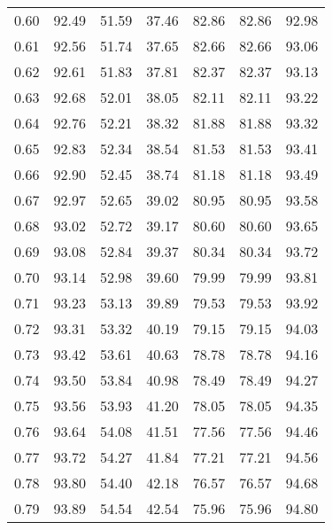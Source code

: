 \begin{tabular}{|c|c|c|c|c|c|c|}
      0.60 &     92.49 &     51.59 &      37.46 &   82.86 &      82.86 &         92.98 \\
      0.61 &     92.56 &     51.74 &      37.65 &   82.66 &      82.66 &         93.06 \\
      0.62 &     92.61 &     51.83 &      37.81 &   82.37 &      82.37 &         93.13 \\
      0.63 &     92.68 &     52.01 &      38.05 &   82.11 &      82.11 &         93.22 \\
      0.64 &     92.76 &     52.21 &      38.32 &   81.88 &      81.88 &         93.32 \\
      0.65 &     92.83 &     52.34 &      38.54 &   81.53 &      81.53 &         93.41 \\
      0.66 &     92.90 &     52.45 &      38.74 &   81.18 &      81.18 &         93.49 \\
      0.67 &     92.97 &     52.65 &      39.02 &   80.95 &      80.95 &         93.58 \\
      0.68 &     93.02 &     52.72 &      39.17 &   80.60 &      80.60 &         93.65 \\
      0.69 &     93.08 &     52.84 &      39.37 &   80.34 &      80.34 &         93.72 \\
      0.70 &     93.14 &     52.98 &      39.60 &   79.99 &      79.99 &         93.81 \\
      0.71 &     93.23 &     53.13 &      39.89 &   79.53 &      79.53 &         93.92 \\
      0.72 &     93.31 &     53.32 &      40.19 &   79.15 &      79.15 &         94.03 \\
      0.73 &     93.42 &     53.61 &      40.63 &   78.78 &      78.78 &         94.16 \\
      0.74 &     93.50 &     53.84 &      40.98 &   78.49 &      78.49 &         94.27 \\
      0.75 &     93.56 &     53.93 &      41.20 &   78.05 &      78.05 &         94.35 \\
      0.76 &     93.64 &     54.08 &      41.51 &   77.56 &      77.56 &         94.46 \\
      0.77 &     93.72 &     54.27 &      41.84 &   77.21 &      77.21 &         94.56 \\
      0.78 &     93.80 &     54.40 &      42.18 &   76.57 &      76.57 &         94.68 \\
      0.79 &     93.89 &     54.54 &      42.54 &   75.96 &      75.96 &         94.80 \\

\end{tabular}
